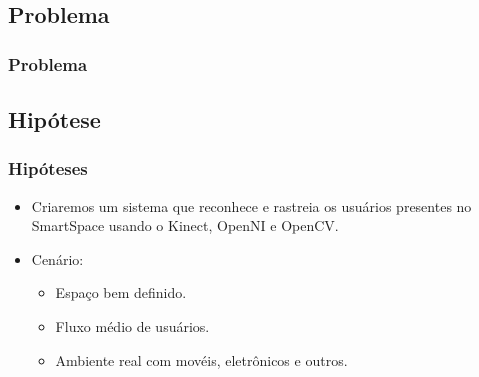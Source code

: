 \documentclass{beamer}
\begin{document}
\subsection{Problema}
\begin{frame}
    \frametitle{Problema}

\end{frame}


\subsection{Hipótese}
\begin{frame}
    \frametitle{Hipóteses}
    \begin{itemize}
      \item Criaremos um sistema que reconhece e rastreia os usuários presentes no SmartSpace usando o Kinect, OpenNI e OpenCV.

      \item Cenário:
        \begin{itemize}
            \item Espaço bem definido.
            \item Fluxo médio de usuários.
            \item Ambiente real com movéis, eletrônicos e outros.
        \end{itemize} 
    \end{itemize}
\end{frame}
\end{document}
